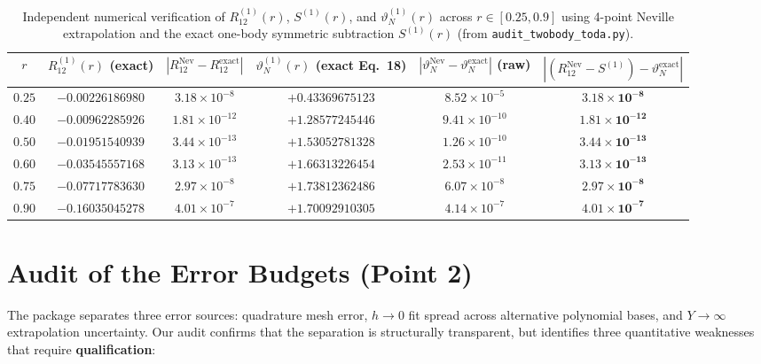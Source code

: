 \documentclass[11pt,a4paper]{article}
\begin{document}
\begin{table}[ht!]
\centering
\small
\caption{Independent numerical verification of $R_{12}^{(1)}(r)$, $S^{(1)}(r)$, and $\vartheta_N^{(1)}(r)$ across $r\in[0.25,0.9]$ using 4-point Neville extrapolation and the exact one-body symmetric subtraction $S^{(1)}(r)$ (from \texttt{audit\_twobody\_toda.py}).}
\label{tab:vartheta_verify}
\begin{tabular}{@{}cccccc@{}}
\toprule
$r$ & $R_{12}^{(1)}(r)$ (exact) & $|R_{12}^{\text{Nev}}-R_{12}^{\text{exact}}|$ & $\vartheta_N^{(1)}(r)$ (exact Eq.~18) & $|\vartheta_N^{\text{Nev}}-\vartheta_N^{\text{exact}}|$ (raw) & $|(R_{12}^{\text{Nev}}-S^{(1)})-\vartheta_N^{\text{exact}}|$ \\
\midrule
$0.25$ & $-0.00226186980$ & $3.18\times 10^{-8}$ & $+0.43369675123$ & $8.52\times 10^{-5}$ & $\mathbf{3.18\times 10^{-8}}$ \\
$0.40$ & $-0.00962285926$ & $1.81\times 10^{-12}$ & $+1.28577245446$ & $9.41\times 10^{-10}$ & $\mathbf{1.81\times 10^{-12}}$ \\
$0.50$ & $-0.01951540939$ & $3.44\times 10^{-13}$ & $+1.53052781328$ & $1.26\times 10^{-10}$ & $\mathbf{3.44\times 10^{-13}}$ \\
$0.60$ & $-0.03545557168$ & $3.13\times 10^{-13}$ & $+1.66313226454$ & $2.53\times 10^{-11}$ & $\mathbf{3.13\times 10^{-13}}$ \\
$0.75$ & $-0.07717783630$ & $2.97\times 10^{-8}$ & $+1.73812362486$ & $6.07\times 10^{-8}$ & $\mathbf{2.97\times 10^{-8}}$ \\
$0.90$ & $-0.16035045278$ & $4.01\times 10^{-7}$ & $+1.70092910305$ & $4.14\times 10^{-7}$ & $\mathbf{4.01\times 10^{-7}}$ \\
\bottomrule
\end{tabular}
\end{table}

\section{Audit of the Error Budgets (Point 2)}
\label{sec:budgets}

The package separates three error sources: quadrature mesh error, $h\to 0$ fit spread across alternative polynomial bases, and $Y\to\infty$ extrapolation uncertainty. Our audit confirms that the separation is structurally transparent, but identifies three quantitative weaknesses that require \textbf{qualification}:
\end{document}
